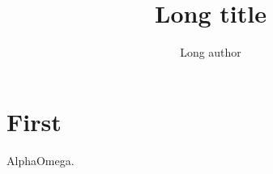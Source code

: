 \documentclass[11pt,aspectratio=169]{beamer}
\title[Short title]{Long title}\author[Two line author name]{Long author}
\date{}
\begin{document}
\section{First}\begin{frame}{Alpha}Omega.\end{frame}
\end{document}
